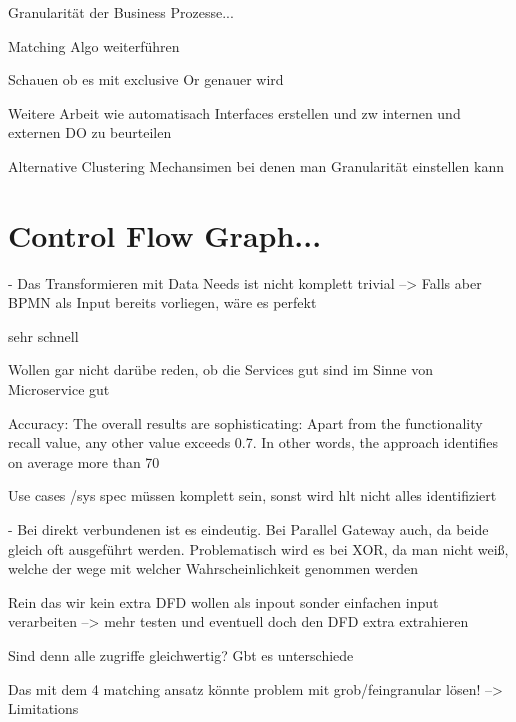 Granularität der Business Prozesse...


Matching Algo weiterführen

Schauen ob es mit exclusive Or genauer wird


Weitere Arbeit wie automatisach Interfaces erstellen und zw internen und externen DO zu beurteilen

Alternative Clustering Mechansimen bei denen man Granularität einstellen kann




\section{Control Flow Graph...}
- Das Transformieren mit Data Needs ist nicht komplett trivial --> Falls aber BPMN als Input bereits vorliegen, wäre es perfekt

sehr schnell


Wollen gar nicht darübe reden, ob die Services gut sind im Sinne von Microservice gut


Accuracy:
The overall results are sophisticating: Apart from the functionality recall value, any other value exceeds 0.7. In other words, the approach identifies on average more than 70   


Use cases /sys spec müssen komplett sein, sonst wird hlt nicht alles identifiziert


- Bei direkt verbundenen ist es eindeutig. Bei Parallel Gateway auch, da beide gleich oft ausgeführt werden. Problematisch wird es bei XOR, da man nicht weiß, welche der wege mit welcher Wahrscheinlichkeit genommen werden



Rein das wir kein extra DFD wollen als inpout sonder einfachen input verarbeiten --> mehr testen und eventuell doch den DFD extra extrahieren


Sind denn alle zugriffe gleichwertig? Gbt es unterschiede


Das mit dem 4 matching ansatz könnte problem mit grob/feingranular lösen! --> Limitations